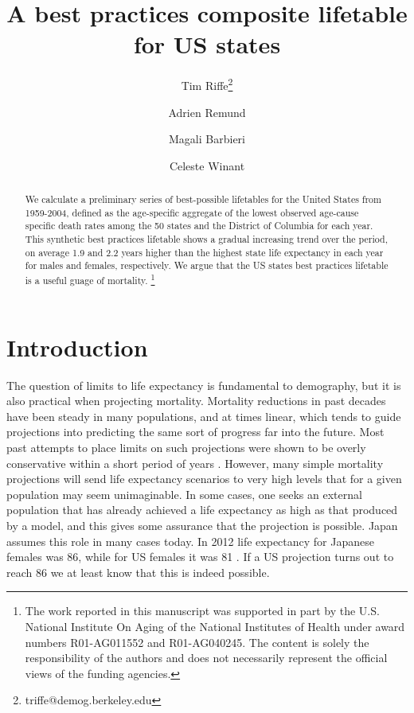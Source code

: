 \documentclass[11pt,oneside,a4paper]{article} %
\newcommand\ackn[1]{%
  \begingroup
  \renewcommand\thefootnote{}\footnote{#1}%
  \addtocounter{footnote}{-1}%
  \endgroup
}
\begin{document}
\title{A best practices composite lifetable for US states}

\author[1]{Tim Riffe\thanks{triffe@demog.berkeley.edu}}
\author[2,3]{Adrien Remund}
\author[2,3]{Magali Barbieri}
\author[3]{Celeste Winant}


\maketitle

\begin{abstract}
We calculate a preliminary series of best-possible lifetables for the United
States from 1959-2004, defined as the age-specific aggregate of the lowest
observed age-cause specific death rates among the 50
states and the District of Columbia for each year. This synthetic best practices lifetable shows a gradual
increasing trend over the period, on average 1.9 and 2.2 years higher
than the highest state life expectancy in each year for males and females,
respectively. We argue that the US states best practices lifetable is a useful
guage of mortality.
\ackn{The work reported in this manuscript was supported in part by the U.S.
National Institute On Aging of the National Institutes of Health under award
numbers R01-AG011552 and R01-AG040245. The content is solely the responsibility of the authors and does not necessarily represent the official views of the funding agencies.}
\end{abstract}


\section*{Introduction}

The question of limits to life expectancy is fundamental to demography, but it
is also practical when projecting mortality. Mortality reductions in past
decades have been steady in many populations, and at times linear, which tends
to guide projections into predicting the same sort of progress far into the
future. Most past attempts to place limits on such projections were shown to be
overly conservative within a short period of years \citep{oeppen2002broken}.
However, many simple mortality projections will send life expectancy scenarios
to very high levels that for a given population may seem unimaginable. In some
cases, one seeks an external population that has already achieved a life
expectancy as high as that produced by a model, and this gives some assurance
that the projection is possible. Japan assumes this role in many cases today. In
2012 life expectancy for Japanese females was 86, while for US females it was 81
\citep{HMD}. If a US projection turns out to reach 86 we at least know that this
is indeed possible.
\end{document}
